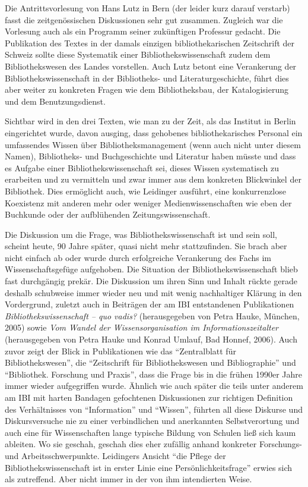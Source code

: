 \documentclass[a4paper,
fontsize=11pt,
oneside,
numbers=noperiodatend,
parskip=half-,
bibliography=totoc,
final
]{scrartcl}
\begin{document}
Die Antrittsvorlesung von Hans Lutz in Bern (der leider kurz darauf
verstarb) fasst die zeitgenössischen Diskussionen sehr gut zusammen.
Zugleich war die Vorlesung auch als ein Programm seiner zukünftigen
Professur gedacht. Die Publikation des Textes in der damals einzigen
bibliothekarischen Zeitschrift der Schweiz sollte diese Systematik einer
Bibliothekswissenschaft zudem dem Bibliothekswesen des Landes
vorstellen. Auch Lutz betont eine Verankerung der
Bibliothekswissenschaft in der Bibliotheks- und Literaturgeschichte,
führt dies aber weiter zu konkreten Fragen wie dem Bibliotheksbau, der
Katalogisierung und dem Benutzungsdienst.

Sichtbar wird in den drei Texten, wie man zu der Zeit, als das Institut
in Berlin eingerichtet wurde, davon ausging, dass gehobenes
bibliothekarisches Personal ein umfassendes Wissen über
Bibliotheksmanagement (wenn auch nicht unter diesem Namen), Bibliotheks-
und Buchgeschichte und Literatur haben müsste und dass es Aufgabe einer
Bibliothekswissenschaft sei, dieses Wissen systematisch zu erarbeiten
und zu vermitteln und zwar immer aus dem konkreten Blickwinkel der
Bibliothek. Dies ermöglicht auch, wie Leidinger ausführt, eine
konkurrenzlose Koexistenz mit anderen mehr oder weniger
Medienwissenschaften wie eben der Buchkunde oder der aufblühenden
Zeitungswissenschaft.

Die Diskussion um die Frage, was Bibliothekswissenschaft ist und sein
soll, scheint heute, 90 Jahre später, quasi nicht mehr stattzufinden.
Sie brach aber nicht einfach ab oder wurde durch erfolgreiche
Verankerung des Fachs im Wissenschaftsgefüge aufgehoben. Die Situation
der Bibliothekswissenschaft blieb fast durchgängig prekär. Die
Diskussion um ihren Sinn und Inhalt rückte gerade deshalb schubweise
immer wieder neu und mit wenig nachhaltiger Klärung in den Vordergrund,
zuletzt auch in Beiträgen der am IBI entstandenen Publikationen
\emph{Bibliothekswissenschaft -- quo vadis?} (herausgegeben von Petra
Hauke, München, 2005) sowie \emph{Vom Wandel der Wissensorganisation im
Informationszeitalter} (herausgegeben von Petra Hauke und Konrad Umlauf,
Bad Honnef, 2006). Auch zuvor zeigt der Blick in Publikationen wie das
\enquote{Zentralblatt für Bibliothekswesen}, die \enquote{Zeitschrift
für Bibliothekswesen und Bibliographie} und \enquote{Bibliothek.
Forschung und Praxis}, dass die Frage bis in die frühen 1990er Jahre
immer wieder aufgegriffen wurde. Ähnlich wie auch später die teils unter
anderem am IBI mit harten Bandagen gefochtenen Diskussionen zur
richtigen Definition des Verhältnisses von \enquote{Information} und
\enquote{Wissen}, führten all diese Diskurse und Diskursversuche nie zu
einer verbindlichen und anerkannten Selbstverortung und auch eine für
Wissenschaften lange typische Bildung von Schulen ließ sich kaum
ableiten. Wo sie geschah, geschah dies eher zufällig anhand konkreter
Forschungs- und Arbeitsschwerpunkte. Leidingers Ansicht \enquote{die
Pflege der Bibliothekswissenschaft ist in erster Linie eine
Persönlichkeitsfrage} erwies sich als zutreffend. Aber nicht immer in
der von ihm intendierten Weise.
\end{document}
